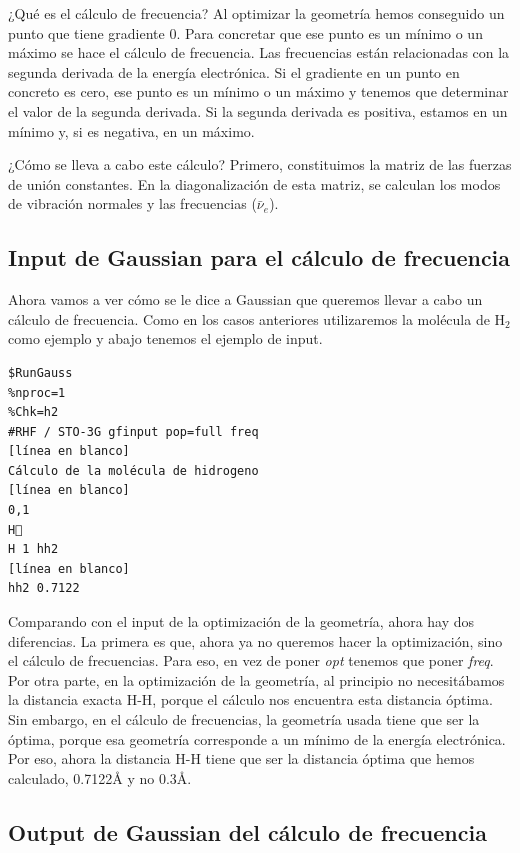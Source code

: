 \documentclass{tufte-book}
\begin{document}
¿Qué es el cálculo de frecuencia? Al optimizar la geometría hemos conseguido un punto que tiene gradiente 0. Para concretar que ese punto es un mínimo o un máximo se hace el cálculo de frecuencia. Las frecuencias están relacionadas con la segunda derivada de la energía electrónica. Si el gradiente en un punto en concreto es cero, ese punto es un mínimo o un máximo y tenemos que determinar el valor de la segunda derivada. Si la segunda derivada es positiva, estamos en un mínimo y, si es negativa, en un máximo.

¿Cómo se lleva a cabo este cálculo? Primero, constituimos la matriz de las fuerzas de unión constantes. En la diagonalización de esta matriz, se calculan los modos de vibración normales y las frecuencias ($\bar{\nu}_e$).


\subsection{Input de Gaussian para el cálculo de frecuencia}

Ahora vamos a ver cómo se le dice a Gaussian que queremos llevar a cabo un cálculo de frecuencia. Como en los casos anteriores utilizaremos la molécula de H$_2$ como ejemplo y abajo tenemos el ejemplo de input.

\begin{verbatim}
$RunGauss
%nproc=1
%Chk=h2
#RHF / STO-3G gfinput pop=full freq
[línea en blanco]
Cálculo de la molécula de hidrogeno 
[línea en blanco] 
0,1
H
H 1 hh2
[línea en blanco]
hh2 0.7122
\end{verbatim}

Comparando con el input de la optimización de la geometría, ahora hay dos diferencias. La primera es que, ahora ya no queremos hacer la optimización, sino el cálculo de frecuencias. Para eso, en vez de poner \textit{opt} tenemos que poner \textit{freq}. Por otra parte, en la optimización de la geometría, al principio no necesitábamos la distancia exacta H-H, porque el cálculo nos encuentra esta distancia óptima. Sin embargo, en el cálculo de frecuencias, la geometría usada tiene que ser la óptima, porque esa geometría corresponde a un mínimo de la energía electrónica. Por eso, ahora la distancia H-H tiene que ser la distancia óptima que hemos calculado, 0.7122\r{A} y no 0.3\r{A}.


\subsection{Output de Gaussian del cálculo de frecuencia}
\end{document}
